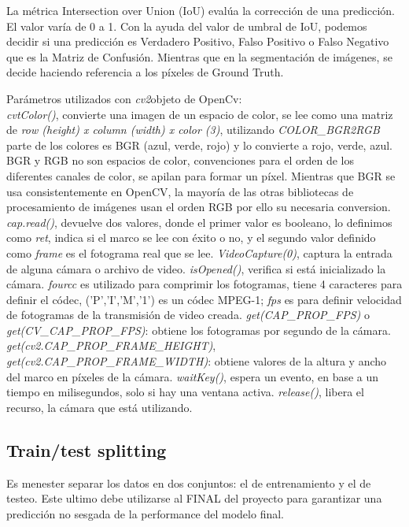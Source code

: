 \documentclass[twoside,11pt]{article}
\begin{document}
La métrica Intersection over Union (IoU) evalúa la corrección de una predicción. 
El valor varía de 0 a 1. Con la ayuda del valor de umbral de IoU, podemos decidir si 
una predicción es Verdadero Positivo, Falso Positivo o Falso Negativo que es la Matriz 
de Confusión. Mientras que en la segmentación de imágenes, se decide haciendo referencia 
a los píxeles de Ground Truth.

Parámetros utilizados con \textit{cv2}objeto de OpenCv:\\
\textit{cvtColor()}, convierte una imagen de un espacio de color, se lee como una matriz 
de \textit{row (height) x column (width) x color (3)}, utilizando \textit{COLOR\_BGR2RGB} 
parte de los colores es BGR (azul, verde, rojo) y lo convierte a rojo, verde, azul. 
BGR y RGB no son espacios de color, convenciones para el orden de los diferentes canales 
de color, se apilan para formar un píxel. Mientras que BGR se usa consistentemente en OpenCV, 
la mayoría de las otras bibliotecas de procesamiento de imágenes usan el orden RGB por ello 
su necesaria conversion.
\textit{cap.read()}, devuelve dos valores, donde el primer valor es booleano, lo definimos 
como \textit{ret}, indica si el marco se lee con éxito o no, y el segundo valor definido 
como \textit{frame} es el fotograma real que se lee.
\textit{VideoCapture(0)}, captura la entrada de alguna cámara o archivo de video.
\textit{isOpened()}, verifica si está inicializado la cámara.
\textit{fourcc} es utilizado para comprimir los fotogramas, tiene 4 caracteres para definir 
el códec, ('P','I','M','1') es un códec MPEG-1; \textit{fps} es para definir velocidad de 
fotogramas de la transmisión de video creada.
\textit{get(CAP\_PROP\_FPS)} o \textit{get(CV\_CAP\_PROP\_FPS)}: obtiene los fotogramas por segundo de la cámara.
\textit{get(cv2.CAP\_PROP\_FRAME\_HEIGHT)}, \textit{get(cv2.CAP\_PROP\_FRAME\_WIDTH)}: obtiene valores 
de la altura y ancho del marco en píxeles de la cámara.
\textit{waitKey()}, espera un evento, en base a un tiempo en milisegundos, solo si hay una ventana activa.
\textit{release()}, libera el recurso, la cámara que está utilizando.

\subsection{Train/test splitting}
Es menester separar los datos en dos conjuntos: 
el de entrenamiento y el de testeo. Este ultimo debe 
utilizarse al FINAL del proyecto para garantizar una 
predicción no sesgada de la performance del modelo final.
\end{document}
